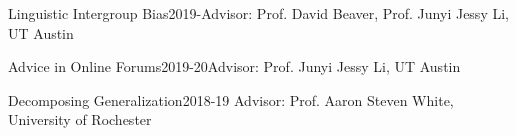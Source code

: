       {Linguistic Intergroup Bias}{2019-}{Advisor: Prof. David Beaver, Prof. Junyi Jessy Li, UT Austin}{}

      {Advice in Online Forums}{2019-20}{Advisor: Prof. Junyi Jessy Li, UT Austin}{}

        {Decomposing Generalization}{2018-19}
        {Advisor: Prof. Aaron Steven White, University of Rochester}{}

